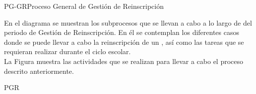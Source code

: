 


\begin{procesoGeneral}{PG-GR}{Proceso General de Gestión de Reinscripción} {
		
		En el diagrama se muestran los subprocesos que se llevan a cabo a lo largo de del periodo de Gestión de Reinscripción. En él se contemplan los diferentes casos donde se puede llevar a cabo la reinscripción de un , así como las tareas que se requieran realizar durante el ciclo escolar.\\
					
		\noindent La Figura  muestra las actividades que se realizan para llevar a cabo el proceso descrito anteriormente.
		
	}{PGR}

\end{procesoGeneral}

